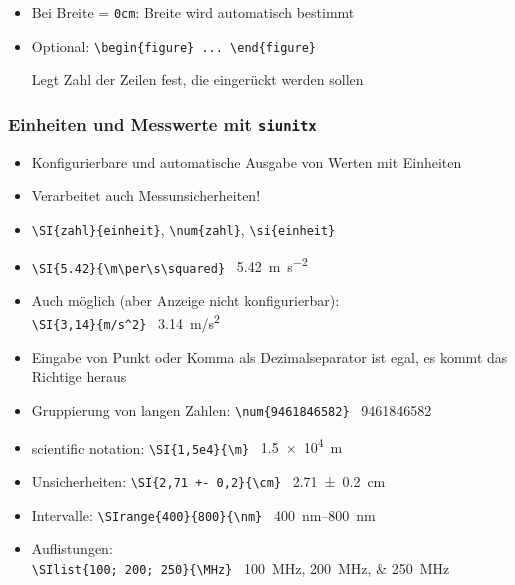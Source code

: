 \begin{frame}[<+->][fragile]
\begin{itemize}
\begin{columns}
		\end{columns}
		\item Bei Breite = \texttt{0cm}: Breite wird automatisch bestimmt
		\item Optional: \lstinline!\begin{figure} ... \end{figure}!
		
		Legt Zahl der Zeilen fest, die eingerückt werden sollen
	\end{itemize}
\end{frame}

\begin{frame}[<+->][fragile]
	\frametitle{Einheiten und Messwerte mit \texttt{siunitx}}
	\begin{itemize}
		\item Konfigurierbare und automatische Ausgabe von Werten mit Einheiten
		\item Verarbeitet auch Messunsicherheiten!
		\item \lstinline!\SI{zahl}{einheit}!, \lstinline!\num{zahl}!, \lstinline!\si{einheit}!
		\item \lstinline!\SI{5.42}{\m\per\s\squared}! \textrightarrow\ {\rmfamily\SI{5.42}{\m\per\s\squared}}
		\item Auch möglich (aber Anzeige nicht konfigurierbar):\\
		\lstinline!\SI{3,14}{m/s^2}! \textrightarrow\ {\rmfamily\SI{3,14}{m/s^2}}
		\item Eingabe von Punkt oder Komma als Dezimalseparator ist egal, es kommt das Richtige heraus
		\item Gruppierung von langen Zahlen: \lstinline!\num{9461846582}! \textrightarrow\ {\rmfamily\num{9461846582}}
		\item scientific notation: \lstinline!\SI{1,5e4}{\m}! \textrightarrow\ {\rmfamily\SI{1,5e4}{\m}}
		\item Unsicherheiten: \lstinline!\SI{2,71 +- 0,2}{\cm}! \textrightarrow\ {\rmfamily\SI{2,71 +- 0,2}{\cm}}
		\item Intervalle: \lstinline!\SIrange{400}{800}{\nm}! \textrightarrow\ {\rmfamily\SIrange{400}{800}{\nm}}
		\item Auflistungen:\\
		\lstinline!\SIlist{100; 200; 250}{\MHz}! \textrightarrow\ {\rmfamily\SIlist{100; 200; 250}{\MHz}}
	\end{itemize}
\end{frame}

